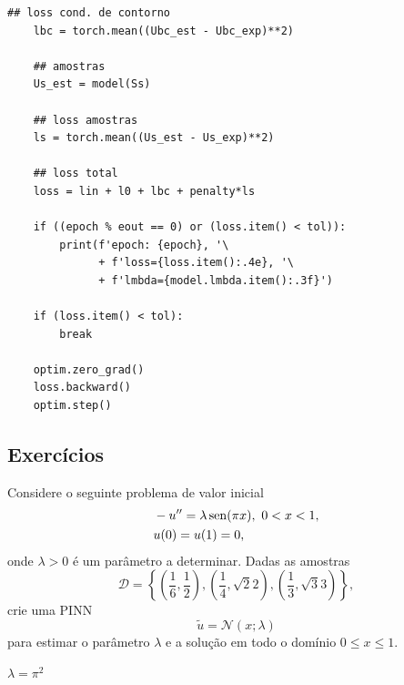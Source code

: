 \begin{ex}
\begin{lstlisting}[caption=ex\_pinn\_fisher.py]
    ## loss cond. de contorno    
    lbc = torch.mean((Ubc_est - Ubc_exp)**2)

    ## amostras
    Us_est = model(Ss)

    ## loss amostras
    ls = torch.mean((Us_est - Us_exp)**2)

    ## loss total
    loss = lin + l0 + lbc + penalty*ls 

    if ((epoch % eout == 0) or (loss.item() < tol)):
        print(f'epoch: {epoch}, '\
              + f'loss={loss.item():.4e}, '\
              + f'lmbda={model.lmbda.item():.3f}')
    
    if (loss.item() < tol):
        break
        
    optim.zero_grad()
    loss.backward()
    optim.step()  
\end{lstlisting}
\end{ex}

\subsection{Exercícios}
\badgeConstrucao

\begin{ex}
  Considere o seguinte problema de valor inicial
  \begin{subequations}
    \begin{align}
      &-u'' = \lambda\operatorname{sen}(\pi x), ~0<x<1,\\
      &u(0) = u(1) = 0,
    \end{align}
  \end{subequations}
  onde $\lambda>0$ é um parâmetro a determinar. Dadas as amostras
  \begin{equation}
    \mathcal{D} = \left\{\left(\frac{1}{6},\frac{1}{2}\right), \left(\frac{1}{4},\sqrt{2}{2}\right), \left(\frac{1}{3},\sqrt{3}{3}\right)\right\},
  \end{equation}
  crie uma PINN 
  \begin{equation}
    \tilde{u} = \mathcal{N}(x;\lambda) 
  \end{equation}
  para estimar o parâmetro $\lambda$ e a solução em todo o domínio $0\leq x\leq 1$.
\end{ex}
\begin{resp}
  $\lambda = \pi^2$
\end{resp}

